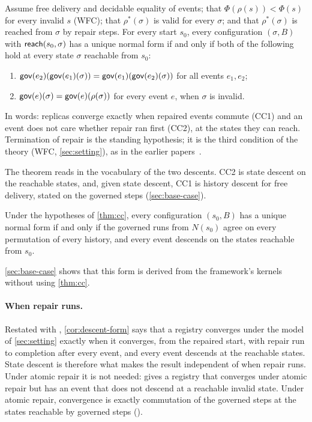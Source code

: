 \begin{theorem}\label{thm:cc}
Assume free delivery and decidable equality of events; that $\Phi(\rho(s)) < \Phi(s)$ for every invalid
$s$ (WFC); that $\rho^{*}(\sigma)$ is valid for every $\sigma$; and that $\rho^{*}(\sigma)$ is reached from
$\sigma$ by repair steps. For every start $s_0$, every configuration
$(\sigma, B)$ with $\mathsf{reach}(s_0, \sigma)$ has a unique normal form if and only if both of the following
hold at every state $\sigma$ reachable from $s_0$:
\begin{enumerate}[label=(CC\arabic*)]
  \item $\mathsf{gov}(e_2)(\mathsf{gov}(e_1)(\sigma)) = \mathsf{gov}(e_1)(\mathsf{gov}(e_2)(\sigma))$ for all events $e_1, e_2$;
  \item $\mathsf{gov}(e)(\sigma) = \mathsf{gov}(e)(\rho(\sigma))$ for every event $e$, when $\sigma$ is invalid.
\end{enumerate}
\end{theorem}

In words: replicas converge exactly when repaired events commute (CC1) and an event does not care
whether repair ran first (CC2), at the states they can reach. Termination of repair is the standing
hypothesis; it is the third condition of the theory (WFC, \cref{sec:setting}), as in the earlier
papers~\cite{blackwell2026fed,blackwell2026stream}.

The theorem reads in the vocabulary of the two descents. CC2 is state descent on the reachable
states, and, given state descent, CC1 is history descent for free delivery, stated on the governed
steps (\cref{sec:base-case}).

\begin{corollary}\label{cor:descent-form}
Under the hypotheses of \cref{thm:cc}, every configuration $(s_0, B)$ has a unique normal form if and
only if the governed runs from $N(s_0)$ agree on every permutation of every history, and every event
descends on the states reachable from $s_0$.
\end{corollary}

\cref{sec:base-case} shows that this form is derived from the framework's kernels without using
\cref{thm:cc}.

\paragraph{When repair runs.} Restated with , \cref{cor:descent-form} says
that a registry converges under the model of \cref{sec:setting} exactly when it converges, from the
repaired start, with repair run to completion after every event, and every event descends at the
reachable states. State descent is therefore what makes
the result independent of when repair runs. Under atomic repair it is not needed: 
gives a registry that converges under atomic repair but has an event that does not descend at a reachable
invalid state. Under atomic repair, convergence is exactly commutation of the governed steps at the states
reachable by governed steps ().

